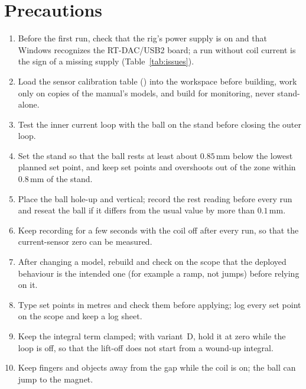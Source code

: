 \documentclass[11pt,a4paper]{article}
\newcommand{\code}[1]{\texttt{\detokenize{#1}}}
\begin{document}
\section{Precautions}
\label{sec:precautions}
\begin{enumerate}
\item Before the first run, check that the rig's power supply is on and that Windows recognizes the RT-DAC/USB2 board; a run
      without coil current is the sign of a missing supply (Table~\ref{tab:issues}).
\item Load the sensor calibration table (\code{SensorData}) into the workspace before building, work only on copies of the
      manual's models, and build for monitoring, never stand-alone.
\item Test the inner current loop with the ball on the stand before closing the outer loop.
\item Set the stand so that the ball rests at least about $0.85$\,mm below the lowest planned set point, and keep set points and
      overshoots out of the zone within $0.8$\,mm of the stand.
\item Place the ball hole-up and vertical; record the rest reading before every run and reseat the ball if it differs from the
      usual value by more than $0.1$\,mm.
\item Keep recording for a few seconds with the coil off after every run, so that the current-sensor zero can be measured.
\item After changing a model, rebuild and check on the scope that the deployed behaviour is the intended one (for example a ramp,
      not jumps) before relying on it.
\item Type set points in metres and check them before applying; log every set point on the scope and keep a log sheet.
\item Keep the integral term clamped; with variant~D, hold it at zero while the loop is off, so that the lift-off does not start
      from a wound-up integral.
\item Keep fingers and objects away from the gap while the coil is on; the ball can jump to the magnet.
\end{enumerate}
\end{document}
